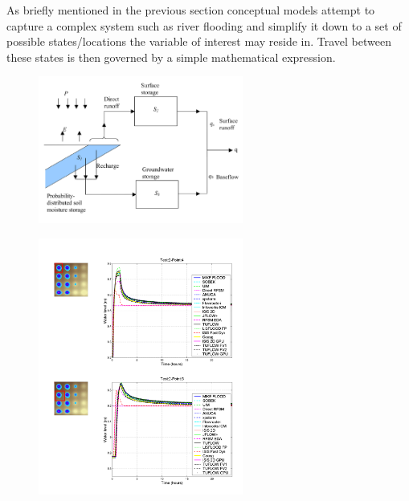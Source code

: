 \documentclass[11pt]{article}
\begin{document}
 As briefly mentioned in the previous section conceptual models attempt to capture a complex system such as river flooding and simplify it down to a set of possible states/locations the variable of interest may reside in. Travel between these states is then governed by a simple mathematical expression.
 
 \begin{minipage}{0.5\textwidth}
    \begin{figure}[H]
        \centering
        \includegraphics[width=0.6\textwidth]{Figs/Concept.png}
        \label{fig:conceptual}
    \end{figure}
    \begin{figure}[H]
        \centering
        \includegraphics[width=0.6\textwidth]{Figs/EA_bench.png}
        \label{fig:eaBench}
    \end{figure}
\end{minipage}
\hspace{0.05\textwidth}
\end{document}
